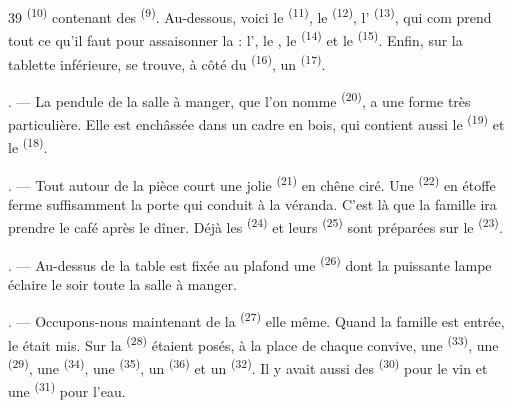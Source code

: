\begin{VUpage}[41]{39}
\VUcontinue
{} \textsuperscript{(10)} contenant des  \textsuperscript{(9)}. Au-dessous, voici\nl
le  \textsuperscript{(11)}, le  \textsuperscript{(12)}, l' \textsuperscript{(13)}, qui com\cc
prend tout ce qu'il faut pour assaisonner la  :\nl
l', le , le  \textsuperscript{(14)} et le  \textsuperscript{(15)}.\nl
Enfin, sur la tablette inférieure, se trouve, à côté du\nl
{} \textsuperscript{(16)}, un  \textsuperscript{(17)}.

. --- La pendule de la salle à manger, que l'on\nl
nomme  \textsuperscript{(20)}, a une forme très particulière. Elle\nl
est enchâssée dans un cadre en bois, qui contient aussi\nl
le  \textsuperscript{(19)} et le  \textsuperscript{(18)}.

. --- Tout autour de la pièce court une jolie\nl
{} \textsuperscript{(21)} en chêne ciré. Une  \textsuperscript{(22)} en\nl
étoffe ferme suffisamment la porte qui conduit à la\nl
véranda. C'est là que la famille ira prendre le café\nl
après le dîner. Déjà les  \textsuperscript{(24)} et leurs \cc
{} \textsuperscript{(25)} sont préparées sur le  \textsuperscript{(23)}.

. --- Au-dessus de la table est fixée au plafond\nl
une  \textsuperscript{(26)} dont la puissante lampe éclaire\nl
le soir toute la salle à manger.

. --- Occupons-nous maintenant de la  \textsuperscript{(27)} elle\cc
même. Quand la famille est entrée, le  était\nl
mis. Sur la  \textsuperscript{(28)} étaient posés, à la place de\nl
chaque convive, une  \textsuperscript{(33)}, une  \textsuperscript{(29)},\nl
une  \textsuperscript{(34)}, une  \textsuperscript{(35)}, un \cc
{} \textsuperscript{(36)} et un  \textsuperscript{(32)}. Il y avait aussi des \cc
{} \textsuperscript{(30)} pour le vin et une  \textsuperscript{(31)} pour l'eau.


\end{VUpage}

